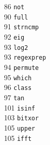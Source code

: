 \begin{footnotesize}
\begin{multicols}{3}
\vspace{-.153cm} 86    \hspace{.2cm} {\tt not                 }    \\ %
\vspace{-.153cm} 90    \hspace{.2cm} {\tt full                }    \\ %
\vspace{-.153cm} 91    \hspace{.2cm} {\tt strncmp             }    \\ %
\vspace{-.153cm} 92    \hspace{.2cm} {\tt eig                 }    \\ %
\vspace{-.153cm} 93    \hspace{.2cm} {\tt log2                }    \\ %
\vspace{-.153cm} 93    \hspace{.2cm} {\tt regexprep           }    \\ %
\vspace{-.153cm} 94    \hspace{.2cm} {\tt permute             }    \\ %
\vspace{-.153cm} 95    \hspace{.2cm} {\tt which               }    \\ %
\vspace{-.153cm} 96    \hspace{.2cm} {\tt class               }    \\ %
\vspace{-.153cm} 97    \hspace{.2cm} {\tt tan                 }    \\ %
\vspace{-.153cm} 101   \hspace{.2cm} {\tt isinf               }     \\ %
\vspace{-.153cm} 103   \hspace{.2cm} {\tt bitxor              }     \\ %
\vspace{-.153cm} 105   \hspace{.2cm} {\tt upper               }     \\ %
\vspace{-.153cm} 105   \hspace{.2cm} {\tt ifft                }     \\ %

\end{multicols}
\end{footnotesize}

